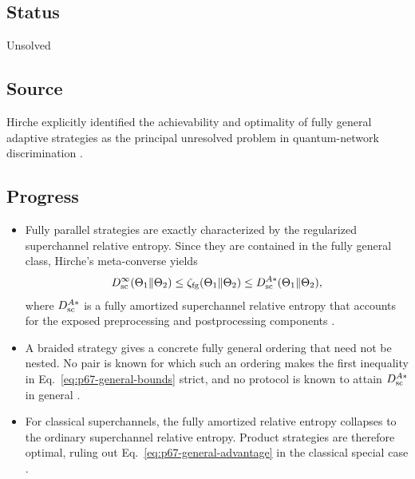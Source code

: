 \subsection*{Status}

Unsolved

\subsection*{Source}

Hirche explicitly identified the achievability and optimality of fully general
adaptive strategies as the principal unresolved problem in quantum-network
discrimination .

\subsection*{Progress}

\begin{itemize}
  \item Fully parallel strategies are exactly characterized by the regularized
  superchannel relative entropy.  Since they are contained in the fully
  general class, Hirche's meta-converse yields
  \begin{equation}
    D_{\rm sc}^{\infty}(\Theta_1\|\Theta_2)
    \leq\zeta_{\mathrm{fg}}(\Theta_1\|\Theta_2)
    \leq D_{\rm sc}^{A*}(\Theta_1\|\Theta_2),
    \label{eq:p67-general-bounds}
  \end{equation}
  where $D_{\rm sc}^{A*}$ is a fully amortized superchannel relative entropy
  that accounts for the exposed preprocessing and postprocessing components
  .

  \item A braided strategy gives a concrete fully general ordering that need
  not be nested.  No pair is known for which such an ordering makes the first
  inequality in Eq.~\eqref{eq:p67-general-bounds} strict, and no protocol is
  known to attain $D_{\rm sc}^{A*}$ in general
  .

  \item For classical superchannels, the fully amortized relative entropy
  collapses to the ordinary superchannel relative entropy.  Product strategies
  are therefore optimal, ruling out Eq.~\eqref{eq:p67-general-advantage} in
  the classical special case .
\end{itemize}

